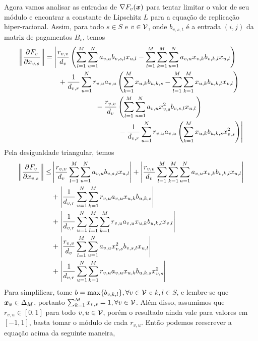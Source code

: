 Agora vamos analisar as entradas de $\nabla F_v(\boldsymbol{x})$ para tentar limitar o valor de seu módulo e encontrar a constante de Lipschitz $L$ para a equação de replicação hiper-racional. Assim, para todo $s\in S$ e $v\in\mathcal{V}$, onde $b_{v,s,t}$ é a entrada $(i,j)$ da matriz de pagamentos $B_v$, temos
\begin{equation}
    \left\|\pdv{F_v}{x_{v,s}}\right\| = \!\begin{multlined}[t]
        \Biggl| \frac{r_{v,v}}{d_v} \left( 
        \sum^M_{l=1}\sum^N_{u=1} a_{v,u}b_{v,s,l}x_{u,l} - \sum^M_{l=1}\sum^M_{k=1}\sum^N_{u=1} a_{v,u}x_{v,k}b_{v,k,l}x_{u,l} \right) \\
        + \frac{1}{d_{v,r}}\sum^N_{u=1}r_{v,u}a_{v,u}\left( \sum^M_{k=1}x_{u,k}b_{u,k,s} - \sum^M_{l=1}\sum^M_{k=1}x_{u,k}b_{u,k,l}x_{v,l}\right) \\
        - \frac{r_{v,v}}{d_v}\left( \sum^M_{l=1}\sum^N_{u=1} a_{v,u}x_{v,s}^2b_{v,s,l}x_{u,l} \right)  \\
        - \frac{1}{d_{v,r}}\sum^N_{u=1}r_{v,u}a_{v,u}
        \left( \sum^M_{k=1}x_{u,k}b_{u,k,s}x_{v,s}^2\right) \Biggr|
    \end{multlined}
\end{equation}
Pela desigualdade triangular, temos
\begin{equation}
\begin{split}
    \left\|\frac{\partial^{}F_v}{\partial {x_{v,s}}^{}}\right\| \leq &
    \left| \frac{r_{v,v}}{d_v}\sum^M_{l=1}\sum^N_{u=1} a_{v,u}b_{v,s,l}x_{u,l} \right| + \left| \frac{r_{v,v}}{d_v}\sum^M_{l=1}\sum^M_{k=1}\sum^N_{u=1} a_{v,u}x_{v,k}b_{v,k,l}x_{u,l} \right| \\
    &+ \left|\frac{1}{d_{v,r}}\sum^N_{u=1} \sum^M_{k=1} r_{v,u}a_{v,u} x_{u,k}b_{u,k,s} \right| \\&+ 
    \left|\frac{1}{d_{v,r}}\sum^N_{u=1}\sum^M_{l=1}\sum^M_{k=1} r_{v,u}a_{v,u}x_{u,k}b_{u,k,l}x_{v,l}\right| \\&+
    \left|\frac{r_{v,v}}{d_v} \sum^M_{l=1}\sum^N_{u=1} a_{v,u}x_{v,s}^2b_{v,s,l}x_{u,l} \right| \\
    &+ \left| \frac{1}{d_{v,r}}\sum^N_{u=1}\sum^M_{k=1} r_{v,u}a_{v,u}x_{u,k}b_{u,k,s}x_{v,s}^2\right|
\end{split}
\end{equation}
Para simplificar, tome $b=\max\{b_{v,k,l}\},\forall v\in\mathcal{V}$ e $k,l\in S$, e lembre-se que $\boldsymbol{x_v}\in\Delta_M$, portanto $\sum_{k=1}^M x_{v,s}=1,\forall v\in\mathcal{V}$. Além disso, assumimos que $r_{v,u}\in[0,1]$ para todo $v,u\in\mathcal{V}$, porém o resultado ainda vale para valores em $[-1,1]$, basta tomar o módulo de cada $r_{v,u}$. Então podemos reescrever a equação acima da seguinte maneira,
